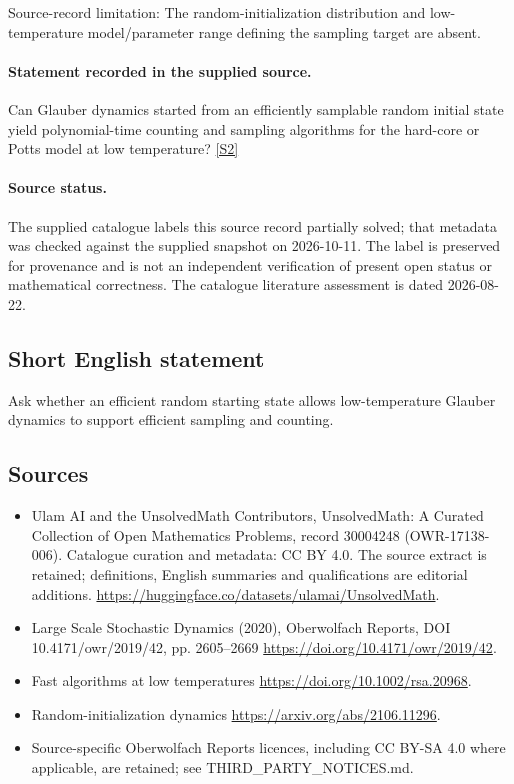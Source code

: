 \documentclass[11pt]{article}
\begin{document}
Source-record limitation: The random-initialization distribution and low-temperature model/parameter range defining the sampling target are absent.
\paragraph{Statement recorded in the supplied source.}
Can Glauber dynamics started from an efficiently samplable random initial state yield polynomial-time counting and sampling algorithms for the hard-core or Potts model at low temperature? \href{https://doi.org/10.4171/owr/2019/42}{[S2]}
\paragraph{Source status.}
The supplied catalogue labels this source record partially solved; that metadata was checked against the supplied snapshot on 2026-10-11. The label is preserved for provenance and is not an independent verification of present open status or mathematical correctness. The catalogue literature assessment is dated 2026-08-22.
\subsection{Short English statement}
Ask whether an efficient random starting state allows low-temperature Glauber dynamics to support efficient sampling and counting.
\subsection{Sources}
\begin{itemize}
\item[S1] Ulam AI and the UnsolvedMath Contributors, UnsolvedMath: A Curated Collection of Open Mathematics Problems, record 30004248 (OWR-17138-006). Catalogue curation and metadata: CC BY 4.0. The source extract is retained; definitions, English summaries and qualifications are editorial additions.
\url{https://huggingface.co/datasets/ulamai/UnsolvedMath}.
\item[S2] Large Scale Stochastic Dynamics (2020), Oberwolfach Reports, DOI 10.4171/owr/2019/42, pp. 2605--2669
\url{https://doi.org/10.4171/owr/2019/42}.
\item[S3] Fast algorithms at low temperatures
\url{https://doi.org/10.1002/rsa.20968}.
\item[S4] Random-initialization dynamics
\url{https://arxiv.org/abs/2106.11296}.
\item Source-specific Oberwolfach Reports licences, including CC BY-SA 4.0 where applicable, are retained; see THIRD\_PARTY\_NOTICES.md.
\end{itemize}
\end{document}
